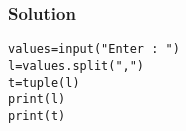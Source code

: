 \begin{frame}[fragile]\frametitle{Solution}
\begin{lstlisting}
values=input("Enter : ")
l=values.split(",")
t=tuple(l)
print(l)
print(t)
\end{lstlisting}
\end{frame}

%
%
%
%

